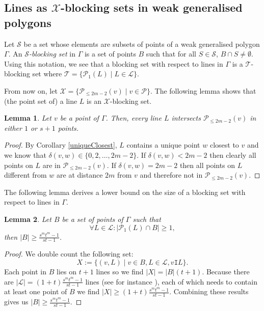 \documentclass[12pt]{article}
\newcommand{\Points}{\mathcal{P}}
\newcommand{\Lines}{\mathcal{L}}
\newcommand{\I}{\mathtt{I}}
\newtheorem{lemma}{Lemma}
\theoremstyle{remark}
\begin{document}
\subsection{\texorpdfstring{Lines as $\mathcal{X}$-blocking sets in weak generalised polygons}{Lines as blocking sets in weak generalised polygons}}\label{subsection:linesasbs}

Let $\mathcal{S}$ be a set whose elements are subsets of points of a weak generalised polygon $\Gamma$. An {\em $\mathcal{S}$-blocking set} in $\Gamma$ is a set of points $B$ such that for all $S\in \mathcal{S}$, $B\cap S\neq \emptyset.$ Using this notation, we see that a blocking set with respect to lines in $\Gamma$ is a $\mathcal{T}$-blocking set where $\mathcal{T}=\{\mathcal{P}_1(L)\mid L\in \Lines\}$.

From now on, let $\mathcal{X}=\{\mathcal{P}_{\leq 2m-2}(v)\mid v \in \Points\}$. 
The following lemma shows that (the point set of) a line $L$ is an $\mathcal{X}$-blocking set. 



\begin{lemma}\label{G4s}
	Let \(v\) be a point of \(\Gamma\). Then, every line \(L\) intersects \(\Points_{\le 2m-2}(v)\) in either \(1\) or \(s+1\) points.   
    
\end{lemma}
\begin{proof}
	By Corollary \ref{uniqueClosest}, \(L\) contains a unique point \(w\) closest to \(v\) and we know that \(\delta(v,w) \in \{0,2,\dots, 2m-2\}\).
	If \(\delta(v,w) < 2m-2\) then clearly all points on \(L\) are in \(\Points_{\leq 2m-2}(v)\). If \(\delta(v,w) = 2m-2\) then all points on \(L\) different from $w$ are at distance \(2m\) from \(v\) and therefore not in \(\Points_{\leq 2m-2}(v)\).
\end{proof}


The following lemma derives a lower bound on the size of a blocking set with respect to lines in $\Gamma$.
\begin{lemma}\label{smallC1} Let \(B\) be a set of points of \(\Gamma\) such that
	\[\forall L\in \Lines: |\Points_{1}(L)\cap B|\ge 1,\]
	then \(|B|\ge \frac{s^m t^m-1}{st-1}\).
\end{lemma}
\begin{proof}
	We double count the following set:
	\[X := \{(v,L)\mid v\in B, L\in \Lines, v\I L\}.\]
	Each point in $B$ lies on \(t+1\) lines so we find \(|X|=|B|(t+1)\).
	Because there are \(|\Lines| = (1+t)\frac{s^m t^m-1}{st-1}\) lines (see for instance \cite{Hendrik}), each of which needs to contain at least one point of  \(B\) we find \(|X|\ge(1+t)\frac{s^m t^m-1}{st-1} \).
	Combining these results gives us \(|B|\ge \frac{s^m t^m-1}{st-1} \).
\end{proof}
\end{document}
